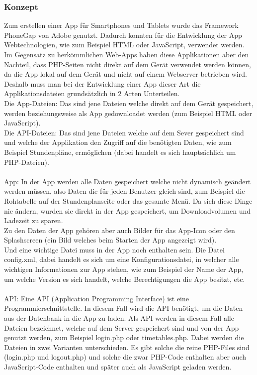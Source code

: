 \subsubsection{Konzept}
Zum erstellen einer App für Smartphones und Tablets wurde das Framework PhoneGap von Adobe genutzt. Dadurch konnten für die Entwicklung der App Webtechnologien, wie zum Beispiel HTML oder JavaScript, verwendet werden. Im Gegensatz zu herkömmlichen Web-Apps haben diese Applikationen aber den Nachteil, dass PHP-Seiten nicht direkt auf dem Gerät verwendet werden können, da die App lokal auf dem Gerät und nicht auf einem Webserver betrieben wird.
Deshalb muss man bei der Entwicklung einer App dieser Art die Applikationsdateien grundsätzlich in 2 Arten Unterteilen.\\
Die App-Dateien: Das sind jene Dateien welche direkt auf dem Gerät gespeichert, werden beziehungsweise als App gedownloadet werden (zum Beispiel HTML oder JavaScript).\\
Die API-Dateien: Das sind jene Dateien welche auf dem Sever gespeichert sind und welche der Applikation den Zugriff auf die benötigten Daten, wie zum Beispiel Stundenpläne, ermöglichen (dabei handelt es sich hauptsächlich um PHP-Dateien).\\
\\
App:	In der App werden alle Daten gespeichert welche nicht dynamisch geändert werden müssen, also Daten die für jeden Benutzer gleich sind, zum Beispiel die Rohtabelle auf der Stundenplanseite oder das gesamte Menü. Da sich diese Dinge nie ändern, wurden sie direkt in der App gespeichert, um Downloadvolumen und Ladezeit zu sparen.\\
Zu den Daten der App gehören aber auch Bilder für das App-Icon oder den Splashscreen (ein Bild welches beim Starten der App angezeigt wird).\\
Und eine wichtige Datei muss in der App noch enthalten sein. Die Datei config.xml, dabei handelt es sich um eine Konfigurationsdatei, in welcher alle wichtigen Informationen zur App stehen, wie zum Beispiel der Name der App, um welche Version es sich handelt, welche Berechtigungen die App besitzt, etc.\\
\\
API:	Eine API (Application Programming Interface) ist eine Programmierschnittstelle. In diesem Fall wird die API benötigt, um die Daten aus der Datenbank in die App zu laden. Als API werden in diesem Fall alle Dateien bezeichnet, welche auf dem Server gespeichert sind und von der App genutzt werden, zum Beispiel login.php oder timetables.php.
Dabei werden die Dateien in zwei Varianten unterschieden. Es gibt solche die reine PHP-Files sind (login.php und logout.php) und solche die zwar PHP-Code enthalten aber auch JavaScript-Code enthalten und später auch als JavaScript geladen werden.\\

